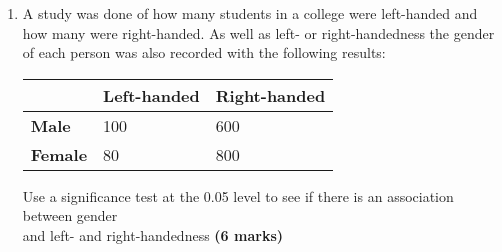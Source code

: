 \documentclass[fleqn]{article}
\begin{document}
\begin{enumerate}
    \item A study was done of how many students in a college were left-handed and how many were right-handed. As well as left- or right-handedness the gender of each person was also recorded with the following results:
        \begin{center}
            \begin{minipage}[t]{0.45\linewidth}
                \begin{tabularx}{\textwidth}{|X|*2{P{25mm}|}}
                      & \textbf{Left-handed} & \textbf{Right-handed}         \\\hline
                    \textbf{Male}          & 100                  & 600                           \\\hline
                    \textbf{Female}        & 80                   & 800                           \\\hline
                \end{tabularx}
                \vspace{3mm}
            \end{minipage}
        \end{center}
        Use a significance test at the 0.05 level to see if there is an association between gender\\ and left- and right-handedness \hfill\textbf{(6 marks)}
        

\end{enumerate}
\end{document}

